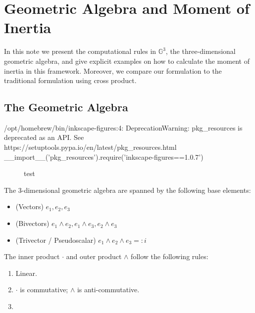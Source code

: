 
\section{Geometric Algebra and Moment of Inertia}


In this note we present the computational rules in $\mathbb{G}^3$, the three-dimensional geometric algebra, and give explicit examples on how to calculate the moment of inertia in this framework. Moreover, we compare our formulation to the traditional formulation using cross product.

\subsection{The Geometric Algebra}
/opt/homebrew/bin/inkscape-figures:4: DeprecationWarning: pkg_resources is deprecated as an API. See https://setuptools.pypa.io/en/latest/pkg_resources.html
  __import__('pkg_resources').require('inkscape-figures==1.0.7')
\begin{figure}[ht]
    \centering
    \caption{test}
    \label{fig:test}
\end{figure}

\begin{definition}
	The 3-dimensional geometric algebra are spanned by the following base elements:
	\begin{itemize}
		\item (Vectors) $e_1, e_2, e_3$
		\item (Bivectors) $e_1 \wedge e_2, e_1 \wedge e_3, e_2 \wedge e_3$
		\item (Trivector / Pseudoscalar) $e_1 \wedge e_2 \wedge e_3 =: i$
	\end{itemize}
	The inner product $\cdot$ and outer product $\wedge$ follow the following rules:
	\begin{enumerate}
		\item Linear.
		\item $\cdot$ is commutative;  $\wedge$ is anti-commutative.
		\item 
	\end{enumerate}
\end{definition}


